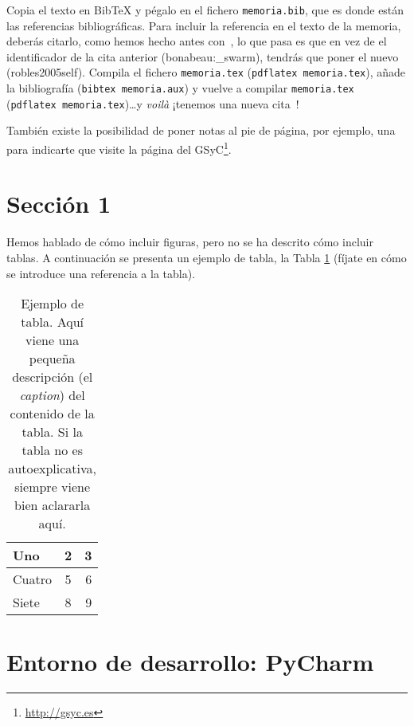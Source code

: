 \documentclass[a4paper, 12pt]{book}
\begin{document}
Copia el texto en BibTeX y pégalo en el fichero \texttt{memoria.bib}, que es donde están las referencias bibliográficas.
Para incluir la referencia en el texto de la memoria, deberás citarlo, como hemos hecho antes con~\cite{bonabeau:_swarm}, lo que pasa es que en vez de el identificador de la cita anterior (bonabeau:\_swarm), tendrás que poner el nuevo (robles2005self).
Compila el fichero \texttt{memoria.tex} (\texttt{pdflatex memoria.tex}), añade la bibliografía (\texttt{bibtex memoria.aux}) y vuelve a compilar \texttt{memoria.tex} (\texttt{pdflatex memoria.tex})\ldots y \emph{voilà} ¡tenemos una nueva cita~\cite{robles2005self}!

También existe la posibilidad de poner notas al pie de página, por ejemplo, una para indicarte que visite la página del GSyC\footnote{\url{http://gsyc.es}}.

\section{Sección 1} 
\label{sec:seccion1}

Hemos hablado de cómo incluir figuras, pero no se ha descrito cómo incluir tablas.
A continuación se presenta un ejemplo de tabla, la Tabla \ref{tabla:ejemplo} (fíjate 
en cómo se introduce una referencia a la tabla).

\begin{table}
 \begin{center}
  \begin{tabular}{ | l | c | r |} %
    \hline
    Uno & 2 & 3 \\ \hline %
    Cuatro & 5 & 6 \\ \hline
    Siete & 8 & 9 \\
    \hline
  \end{tabular}
  \caption{Ejemplo de tabla. Aquí viene una pequeña descripción (el \emph{caption}) del contenido de la tabla. Si la tabla no es autoexplicativa, siempre viene bien aclararla aquí.}
  \label{tabla:ejemplo}
 \end{center}
\end{table}

\section{Entorno de desarrollo: PyCharm}
\label{sec:entorno_de_desarrollo}
\end{document}
